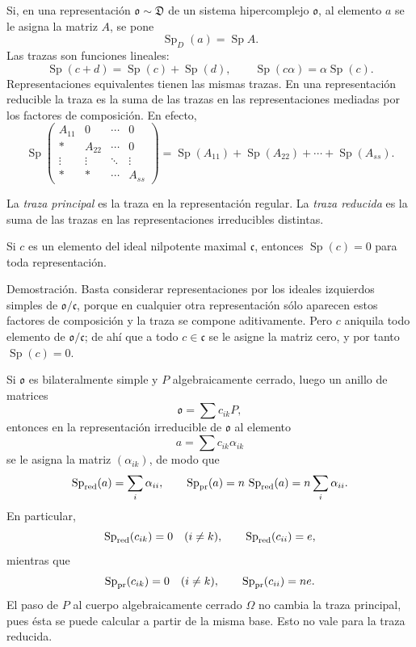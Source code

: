 \documentclass[11pt]{article}
\providecommand{\mo}{\mathfrak{o}}
\providecommand{\mc}{\mathfrak{c}}
\begin{document}
Si, en una representación $\mo\sim\mathfrak D$ de un sistema hipercomplejo $\mo$, al elemento $a$ se le asigna la matriz $A$, se pone
\[
        \operatorname{Sp}_D(a)=\operatorname{Sp} A.
\]
Las trazas son funciones lineales:
\[
        \operatorname{Sp}(c+d)=\operatorname{Sp}(c)+\operatorname{Sp}(d),
        \qquad
        \operatorname{Sp}(c\alpha)=\alpha\operatorname{Sp}(c).
\]
Representaciones equivalentes tienen las mismas trazas. En una representación reducible la traza es la suma de las trazas en las representaciones mediadas por los factores de composición. En efecto,
\[
        \operatorname{Sp}\begin{pmatrix}
        A_{11}&0&\cdots&0\\
        *&A_{22}&\cdots&0\\
        \vdots&\vdots&\ddots&\vdots\\
        *&*&\cdots&A_{ss}
        \end{pmatrix}
        =\operatorname{Sp}(A_{11})+\operatorname{Sp}(A_{22})+\cdots+\operatorname{Sp}(A_{ss}).
\]

La \emph{traza principal} es la traza en la representación regular. La \emph{traza reducida} es la suma de las trazas en las representaciones irreducibles distintas.

Si $c$ es un elemento del ideal nilpotente maximal $\mc$, entonces $\operatorname{Sp}(c)=0$ para toda representación.

Demostración. Basta considerar representaciones por los ideales izquierdos simples de $\mo/\mc$, porque en cualquier otra representación sólo aparecen estos factores de composición y la traza se compone aditivamente. Pero $c$ aniquila todo elemento de $\mo/\mc$; de ahí que a todo $c\in\mc$ se le asigne la matriz cero, y por tanto $\operatorname{Sp}(c)=0$.

Si $\mo$ es bilateralmente simple y $P$ algebraicamente cerrado, luego un anillo de matrices
\[
        \mo=\sum c_{ik}P,
\]
entonces en la representación irreducible de $\mo$ al elemento
\[
        a=\sum c_{ik}\alpha_{ik}
\]
se le asigna la matriz $(\alpha_{ik})$, de modo que
\[
        \operatorname{Sp}_{\rm red}(a)=\sum_i\alpha_{ii},
        \qquad
        \operatorname{Sp}_{\rm pr}(a)=n\,\operatorname{Sp}_{\rm red}(a)=n\sum_i\alpha_{ii}.
\]
En particular,
\[
        \operatorname{Sp}_{\rm red}(c_{ik})=0\quad(i\ne k),\qquad
        \operatorname{Sp}_{\rm red}(c_{ii})=e,
\]
mientras que
\[
        \operatorname{Sp}_{\rm pr}(c_{ik})=0\quad(i\ne k),\qquad
        \operatorname{Sp}_{\rm pr}(c_{ii})=n e.
\]
El paso de $P$ al cuerpo algebraicamente cerrado $\Omega$ no cambia la traza principal, pues ésta se puede calcular a partir de la misma base. Esto no vale para la traza reducida.
\end{document}
